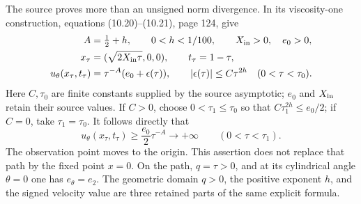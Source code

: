 \documentclass[11pt]{article}
\begin{document}
The source proves more than an unsigned norm divergence. In its
viscosity-one construction, equations (10.20)--(10.21), page 124, give
\begin{equation}
 \begin{split}
 A&=\tfrac12+h,\qquad 0<h<1/100,\qquad X_{\rm in}>0,\quad e_0>0,\\
 x_\tau&=(\sqrt{2X_{\rm in}\tau},0,0),\qquad t_\tau=1-\tau,\\
 u_\theta(x_\tau,t_\tau)
   &=\tau^{-A}(e_0+\epsilon(\tau)),\qquad
      |\epsilon(\tau)|\le C\tau^{2h}\quad(0<\tau<\tau_0).
 \end{split}\label{nsprop:positive_path}
\end{equation}
Here $C,\tau_0$ are finite constants supplied by the source asymptotic;
$e_0$ and $X_{\rm in}$ retain their source values. If $C>0$, choose
$0<\tau_1\le\tau_0$ so that $C\tau_1^{2h}\le e_0/2$; if $C=0$,
take $\tau_1=\tau_0$. It follows directly that
\[
 u_\theta(x_\tau,t_\tau)\ge \frac{e_0}{2}\tau^{-A}
       \longrightarrow+\infty\qquad(0<\tau<\tau_1).
\]
The observation point moves to the origin. This assertion does not
replace that path by the fixed point $x=0$. On the path, $q=\tau>0$,
and at its cylindrical angle $\theta=0$ one has $e_\theta=e_2$.
The geometric domain $q>0$, the positive exponent $h$, and the signed
velocity value are three retained parts of the same explicit formula.
\end{document}
